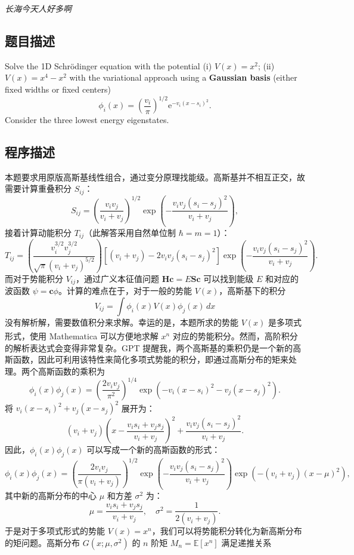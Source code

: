 \textit{长海今天人好多啊}
\subsection{题目描述}
Solve the 1D Schrödinger equation with the potential (i) \( V(x) = x^2 \); (ii) \( V(x) = x^4 - x^2 \) with the variational approach using a \textbf{Gaussian basis} (either fixed widths or fixed centers)
\[
    \phi_i(x)=(\frac{v_i}\pi)^{1/2} \mathrm{e}^{-v_i(x-s_i)^2}.
\]
Consider the three lowest energy eigenstates.

\subsection{程序描述}
本题要求用原版高斯基线性组合，通过变分原理找能级。高斯基并不相互正交，故需要计算重叠积分 $S_{ij}$：
\[
    S_{ij} = \left(\frac{v_i v_j}{v_i + v_j}\right)^{1/2} \exp{\left(-\frac{v_i v_j (s_i - s_j)^2}{v_i + v_j}\right)},
\]
接着计算动能积分 $T_{ij}$（此解答采用自然单位制 $\hbar = m = 1 $）：
\[
    T_{ij} = \left(\frac{v_i^{3/2} v_j^{3/2}}{\sqrt{\pi} (v_i + v_j)^{5/2}}\right) \left[(v_i + v_j) - 2 v_i v_j (s_i - s_j)^2\right] \exp{\left(-\frac{v_i v_j (s_i - s_j)^2}{v_i + v_j}\right)}.
\]
而对于势能积分 $V_{ij}$，通过广义本征值问题 $\mathbf{H} \mathbf{c} = E \mathbf{S} \mathbf{c}$ 可以找到能级 $E$ 和对应的波函数 $\psi = \mathbf{c} \phi$。计算的难点在于，对于一般的势能 $V(x)$，高斯基下的积分
\[
    V_{ij} = \int \phi_i(x) V(x) \phi_j(x) \, dx
\]
没有解析解，需要数值积分来求解。幸运的是，本题所求的势能 $V(x)$ 是多项式形式，使用 Mathematica\textsuperscript{\textregistered} 可以方便地求解 $x^n$ 对应的势能积分。然而，高阶积分的解析表达式会变得非常复杂。GPT 提醒我，两个高斯基的乘积仍是一个新的高斯函数，因此可利用该特性来简化多项式势能的积分，即通过高斯分布的矩来处理。两个高斯函数的乘积为
\[
\phi_i(x) \phi_j(x) = \left(\frac{2 v_i v_j}{\pi^2}\right)^{1/4} \exp\left(-v_i (x - s_i)^2 - v_j (x - s_j)^2\right).
\]
将 $v_i (x - s_i)^2 + v_j (x - s_j)^2$ 展开为：
\[
(v_i + v_j) \left( x - \frac{v_i s_i + v_j s_j}{v_i + v_j} \right)^2 + \frac{v_i v_j (s_i - s_j)^2}{v_i + v_j}.
\]
因此，$\phi_i(x) \phi_j(x)$ 可以写成一个新的高斯函数的形式：
\[
\phi_i(x) \phi_j(x) = \left(\frac{2v_i v_j}{\pi (v_i + v_j)}\right)^{1/2} \exp\left(-\frac{v_i v_j (s_i - s_j)^2}{v_i + v_j}\right) \exp\left(- (v_i + v_j) \left(x - \mu\right)^2 \right),
\]
其中新的高斯分布的中心 $\mu$ 和方差 $\sigma^2$ 为：
\[
\mu = \frac{v_i s_i + v_j s_j}{v_i + v_j}, \quad \sigma^2 = \frac{1}{2(v_i + v_j)}.
\]
于是对于多项式形式的势能 $V(x) = x^n$，我们可以将势能积分转化为新高斯分布的矩问题。高斯分布 $G(x; \mu, \sigma^2)$ 的 $n$ 阶矩 $M_n = \mathbb{E}[x^n]$ 满足递推关系
